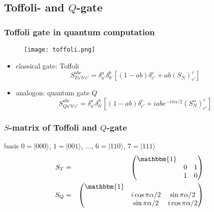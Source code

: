 \documentclass{beamer}
\begin{document}
\subsection{Toffoli- and $Q$-gate}
\begin{frame}
	\frametitle{Toffoli gate in quantum computation}
	\begin{figure}
		\centering
		\texttt{[image: toffoli.png]}
	\end{figure}
	\begin{itemize}
		\item<1-> classical gate: Toffoli
		\begin{equation}
			S_{Ta'b'c'}^{abc}=\delta_{a'}^a\delta_{b'}^b[(1-ab)\delta_{c'}^c+ab(S_N)_{c'}^c]
		\end{equation}
		\item<2-> analogon: quantum gate $Q$
		\begin{equation}
			S_{Qa'b'c'}^{abc}=\delta_{a'}^a\delta_{b'}^b\left[(1-ab)\delta_{c'}^c+iab e^{-i\pi\alpha/2}(S_N^\alpha)_{c'}^c\right]
		\end{equation}
	\end{itemize}
\end{frame}
\begin{frame}
	\frametitle{$S$-matrix of Toffoli and $Q$-gate}
	basis $0=|000\rangle$, $1=|001\rangle$, $\ldots$, $6=|110\rangle$, $7=|111\rangle$
	\begin{eqnarray*}
		S_T&=&\begin{pmatrix}
				\mathbbm{1}&&\\
				&0&1\\
				&1&0
		      \end{pmatrix}\\
		S_Q&=&\begin{pmatrix}
		       \mathbbm{1}&&\\
				&i\cos\pi\alpha/2&\sin\pi\alpha/2\\
				&\sin\pi\alpha/2&i\cos\pi\alpha/2
		      \end{pmatrix}
	\end{eqnarray*}
\end{frame}
%
\end{document}
